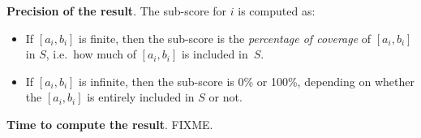 \documentclass[10pt,english,a4paper]{article}
\begin{document}
\textbf{Precision of the result}. The sub-score for $i$ is computed as:
\begin{itemize}
\item
  If $[a_i,b_i]$ is finite, then the sub-score is the
  \textit{percentage of coverage} of $[a_i, b_i]$ in $S$,
  i.e.\ how much of $[a_i,b_i]$ is included in~$S$.
\item
  If $[a_i,b_i]$ is infinite, then the sub-score is 0\% or 100\%, depending on
  whether the $[a_i,b_i]$ is entirely included in $S$ or not.
\end{itemize}

\textbf{Time to compute the result}. FIXME.
\end{document}
